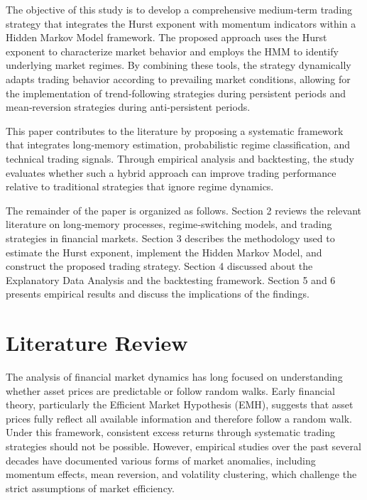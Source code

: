 \documentclass[12pt]{article}
\begin{document}
The objective of this study is to develop a comprehensive medium‑term trading strategy that integrates the Hurst exponent with momentum indicators within a Hidden Markov Model framework. The proposed approach uses the Hurst exponent to characterize market behavior and employs the HMM to identify underlying market regimes. By combining these tools, the strategy dynamically adapts trading behavior according to prevailing market conditions, allowing for the implementation of trend‑following strategies during persistent periods and mean‑reversion strategies during anti‑persistent periods.

This paper contributes to the literature by proposing a systematic framework that integrates long‑memory estimation, probabilistic regime classification, and technical trading signals. Through empirical analysis and backtesting, the study evaluates whether such a hybrid approach can improve trading performance relative to traditional strategies that ignore regime dynamics.

The remainder of the paper is organized as follows. Section 2 reviews the relevant literature on long‑memory processes, regime‑switching models, and trading strategies in financial markets. Section 3 describes the methodology used to estimate the Hurst exponent, implement the Hidden Markov Model, and construct the proposed trading strategy. Section 4 discussed about the Explanatory Data Analysis and the backtesting framework. Section 5 and 6 presents empirical results and discuss the implications of the findings. 

\section{Literature Review}
The analysis of financial market dynamics has long focused on understanding whether asset prices are predictable or follow random walks. Early financial theory, particularly the Efficient Market Hypothesis (EMH), suggests that asset prices fully reflect all available information and therefore follow a random walk. Under this framework, consistent excess returns through systematic trading strategies should not be possible. However, empirical studies over the past several decades have documented various forms of market anomalies, including momentum effects, mean reversion, and volatility clustering, which challenge the strict assumptions of market efficiency.
\end{document}
